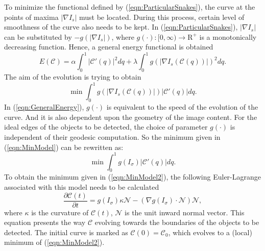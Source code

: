 To minimize the functional defined by (\ref{eqn:ParticularSnakes}), the curve at the points of maxima $|\nabla I_{s}|$ must be located.
During this process, certain level of smoothness of the curve also needs to be kept.
In (\ref{eqn:ParticularSnakes}), $|\nabla I_{s}|$ can be substituted by $-g(|\nabla I_{s}|)$, where $g(\cdot): [0, \infty) \rightarrow \mathrm{R}^{+}$ is a monotonically decreasing function. %
Hence, a general energy functional is obtained
\begin{equation}
\label{eqn:GeneralEnergy}
E(\mathcal{C}) = \alpha \int_0^1 | \mathcal{C}'(q) |^2 dq + \lambda \int_0^1 g( | \nabla I_{s} ( \mathcal{C}(q) ) | )^2 dq.
\end{equation}
The aim of the evolution is trying to obtain
\begin{equation}
\label{eqn:MinModel}
\min \int_0^1 g(|\nabla I_{s} ( \mathcal{C} (q) )|) |\mathcal{C}' (q)| dq.
\end{equation}
In (\ref{eqn:GeneralEnergy}), $g(\cdot)$ is equivalent to the speed of the evolution of the curve.
And it is also dependent upon the geometry of the image content.
For the ideal edges of the objects to be detected, the choice of parameter $g(\cdot)$ is independent of their geodesic computation.
So the minimum given in (\ref{eqn:MinModel}) can be rewritten as:
\begin{equation}
\label{eqn:MinModel2}
\min \int_0^1 g(I_{\sigma}) |\mathcal{C}' (q)| dq.
\end{equation}
To obtain the minimum given in (\ref{eqn:MinModel2}), the following Euler-Lagrange associated with this model needs to be calculated
\begin{equation}
\label{eqn:EvolutionModel}
\frac{\partial \mathcal{C}(t)}{\partial t} = g(I_{\sigma}) \kappa \mathcal{N} - (\nabla g(I_{\sigma}) \cdot \mathcal{N}) \mathcal{N},
\end{equation}
where $\kappa$ is the curvature of $\mathcal{C}(t)$, $\mathcal{N}$ is the unit inward normal vector. %
This equation presents the way $\mathcal{C}$ evolving towards the boundaries of the objects to be detected.
The initial curve is marked as $\mathcal{C}(0) = \mathcal{C}_0$, which evolves to a (local) minimum of (\ref{eqn:MinModel2}).

